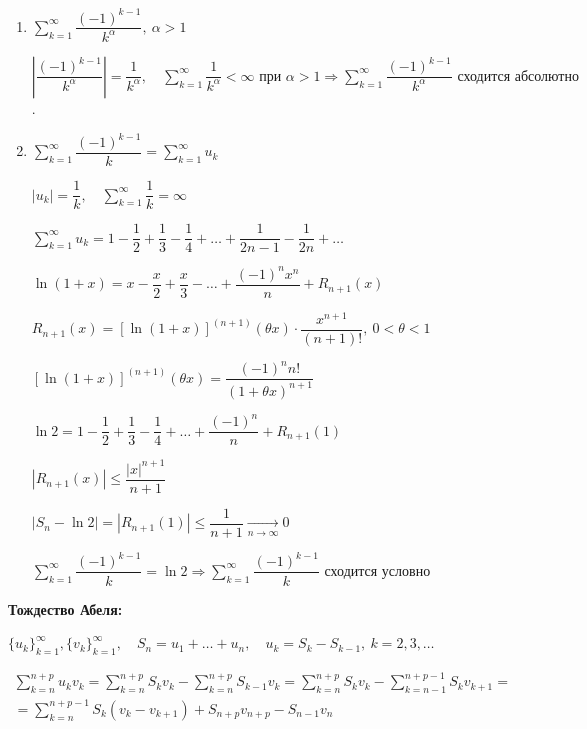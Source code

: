 \documentclass[a4paper,12pt]{article} %
\newcommand{\series}{\sum\limits_{k=1}^{\infty}}
\newcommand{\useries}{\sum\limits_{k=1}^{\infty} u_k}
\begin{document}
\begin{enumerate}
	\item $\series \dfrac{(-1)^{k-1}}{k^{\alpha}}, \ \alpha > 1$
	
	$\left| \dfrac{(-1)^{k-1}}{k^{\alpha}} \right| = \dfrac{1}{k^{\alpha}}, \hspace{1em} \series \dfrac{1}{k^{\alpha}} < \infty \text{ при } \alpha > 1 \Rightarrow \series \dfrac{(-1)^{k-1}}{k^{\alpha}} \text{ сходится абсолютно}$.
	\item $\series \dfrac{(-1)^{k-1}}{k} = \useries$
	
	$|u_k| = \dfrac{1}{k}, \hspace{1em} \series \dfrac{1}{k} = \infty$
	
	$\useries = 1 - \dfrac{1}{2} + \dfrac{1}{3} - \dfrac{1}{4} + \ldots + \dfrac{1}{2n-1} - \dfrac{1}{2n} + \ldots$
	
	$\ln(1+x) = x - {\dfrac{x}{2}} + \dfrac{x}{3} - \ldots + \dfrac{(-1)^n x^n}{n} + R_{n+1}(x)$
	
	$R_{n+1}(x) = \left[ \ln(1+x) \right]^{(n+1)}(\theta x) \cdot \dfrac{x^{n+1}}{(n+1)!}, \ 0<\theta<1$
	
	$\left[ \ln(1+x) \right]^{(n+1)}(\theta x) = \dfrac{(-1)^n n!}{(1+\theta x)^{n+1}}$
	
	$\ln2 = 1 - \dfrac{1}{2} + \dfrac{1}{3} - \dfrac{1}{4} + \ldots + \dfrac{(-1)^n}{n} + R_{n+1}(1)$
	
	$\left| R_{n+1}(x) \right| \leqslant \dfrac{|x|^{n+1}}{n+1}$
	
	$\left| S_n - \ln2 \right| = \left| R_{n+1}(1) \right| \leqslant \dfrac{1}{n+1} \xrightarrow[n \to \infty]{} 0$
	
	$\series \dfrac{(-1)^{k-1}}{k} = \ln2 \Rightarrow \series \dfrac{(-1)^{k-1}}{k} \text{ сходится условно}$
\end{enumerate}

\textbf{Тождество Абеля:}

$\{u_k\}_{k=1}^{\infty}, \{v_k\}_{k=1}^{\infty}, \hspace{1em} S_n = u_1 + \ldots + u_n, \hspace{1em} u_k = S_k - S_{k-1}, \ k = 2, 3, \ldots $

\begin{multline*}
	\sum\limits_{k=n}^{n+p} u_k v_k = \sum\limits_{k=n}^{n+p} S_k v_k - \sum\limits_{k=n}^{n+p} S_{k-1} v_k = \sum\limits_{k=n}^{n+p} S_k v_k - \sum\limits_{k=n-1}^{n+p-1} S_ k v_{k+1} = \\ = \sum\limits_{k=n}^{n+p-1} S_k(v_k - v_{k+1}) + S_{n+p} v_{n+p} - S_{n-1} v_n
\end{multline*}
\end{document}
